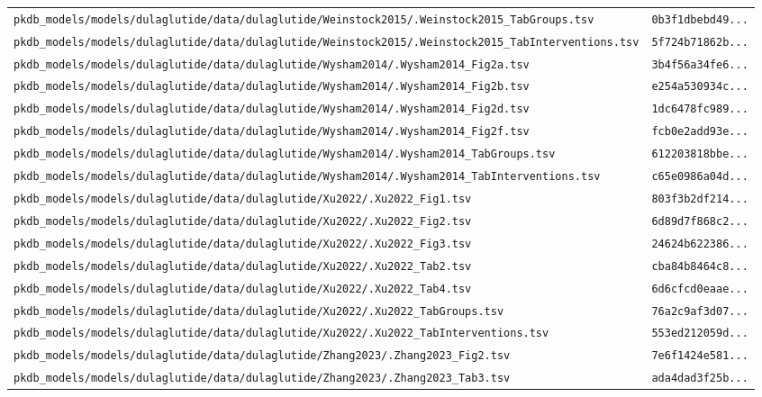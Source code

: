 \documentclass{article}
\begin{document}
\begin{longtable}{ll}
\texttt{pkdb\_models/models/dulaglutide/data/dulaglutide/Weinstock2015/.Weinstock2015\_TabGroups.tsv} & \texttt{0b3f1dbebd49...} \\
\texttt{pkdb\_models/models/dulaglutide/data/dulaglutide/Weinstock2015/.Weinstock2015\_TabInterventions.tsv} & \texttt{5f724b71862b...} \\
\texttt{pkdb\_models/models/dulaglutide/data/dulaglutide/Wysham2014/.Wysham2014\_Fig2a.tsv} & \texttt{3b4f56a34fe6...} \\
\texttt{pkdb\_models/models/dulaglutide/data/dulaglutide/Wysham2014/.Wysham2014\_Fig2b.tsv} & \texttt{e254a530934c...} \\
\texttt{pkdb\_models/models/dulaglutide/data/dulaglutide/Wysham2014/.Wysham2014\_Fig2d.tsv} & \texttt{1dc6478fc989...} \\
\texttt{pkdb\_models/models/dulaglutide/data/dulaglutide/Wysham2014/.Wysham2014\_Fig2f.tsv} & \texttt{fcb0e2add93e...} \\
\texttt{pkdb\_models/models/dulaglutide/data/dulaglutide/Wysham2014/.Wysham2014\_TabGroups.tsv} & \texttt{612203818bbe...} \\
\texttt{pkdb\_models/models/dulaglutide/data/dulaglutide/Wysham2014/.Wysham2014\_TabInterventions.tsv} & \texttt{c65e0986a04d...} \\
\texttt{pkdb\_models/models/dulaglutide/data/dulaglutide/Xu2022/.Xu2022\_Fig1.tsv} & \texttt{803f3b2df214...} \\
\texttt{pkdb\_models/models/dulaglutide/data/dulaglutide/Xu2022/.Xu2022\_Fig2.tsv} & \texttt{6d89d7f868c2...} \\
\texttt{pkdb\_models/models/dulaglutide/data/dulaglutide/Xu2022/.Xu2022\_Fig3.tsv} & \texttt{24624b622386...} \\
\texttt{pkdb\_models/models/dulaglutide/data/dulaglutide/Xu2022/.Xu2022\_Tab2.tsv} & \texttt{cba84b8464c8...} \\
\texttt{pkdb\_models/models/dulaglutide/data/dulaglutide/Xu2022/.Xu2022\_Tab4.tsv} & \texttt{6d6cfcd0eaae...} \\
\texttt{pkdb\_models/models/dulaglutide/data/dulaglutide/Xu2022/.Xu2022\_TabGroups.tsv} & \texttt{76a2c9af3d07...} \\
\texttt{pkdb\_models/models/dulaglutide/data/dulaglutide/Xu2022/.Xu2022\_TabInterventions.tsv} & \texttt{553ed212059d...} \\
\texttt{pkdb\_models/models/dulaglutide/data/dulaglutide/Zhang2023/.Zhang2023\_Fig2.tsv} & \texttt{7e6f1424e581...} \\
\texttt{pkdb\_models/models/dulaglutide/data/dulaglutide/Zhang2023/.Zhang2023\_Tab3.tsv} & \texttt{ada4dad3f25b...} \\

\end{longtable}
\end{document}
